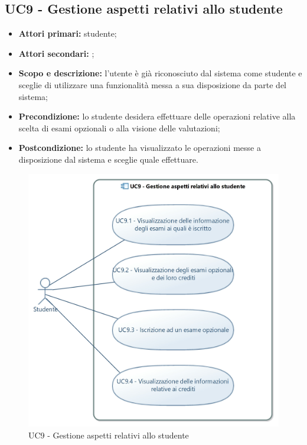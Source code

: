 \documentclass[AnalisiDeiRequisiti.tex]{subfiles}
\begin{document}
\subsection{UC9 - Gestione aspetti relativi allo studente}
\begin{itemize}
	\item \textbf{Attori primari:} studente;
	\item \textbf{Attori secondari:} ;
	\item \textbf{Scopo e descrizione:} l'utente è già riconosciuto dal sistema come studente e sceglie di utilizzare una funzionalità messa a sua disposizione da parte del sistema;
	\item \textbf{Precondizione:} lo studente desidera effettuare delle operazioni relative alla scelta di esami opzionali o alla visione delle valutazioni;
	\item \textbf{Postcondizione:} lo studente ha visualizzato le operazioni messe a disposizione dal sistema e sceglie quale effettuare.
\end{itemize}

\begin{figure}[H]
	\centering
	\includegraphics[width=0.8\linewidth]{UC9.jpg}
	\caption{UC9 - Gestione aspetti relativi allo studente}
	\label{fig:UC9 - Gestione aspetti relativi allo studente} %
\end{figure}
\end{document}

